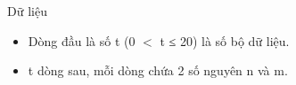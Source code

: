 Dữ liệu
\begin{itemize}
	\item     Dòng đầu là số t (0 $<$ t ≤ 20) là số bộ dữ liệu.   
	\item     t dòng sau, mỗi dòng chứa 2 số nguyên n và m.   
\end{itemize}